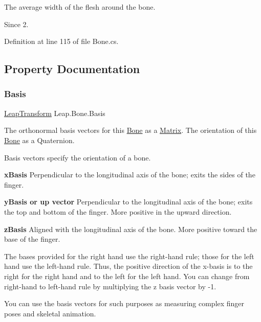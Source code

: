 The average width of the flesh around the bone. 

\begin{DoxySince}{Since}
2. 
\end{DoxySince}


Definition at line 115 of file Bone.\+cs.



\subsection{Property Documentation}
\mbox{\label{class_leap_1_1_bone_a3918f3a7fe8406e54c4715aed7504ab9}} 
\subsubsection{\texorpdfstring{Basis}{Basis}}
{\footnotesize\ttfamily \mbox{\hyperlink{struct_leap_1_1_leap_transform}{Leap\+Transform}} Leap.\+Bone.\+Basis\hspace{0.3cm}{\ttfamily [get]}}



The orthonormal basis vectors for this \mbox{\hyperlink{class_leap_1_1_bone}{Bone}} as a \mbox{\hyperlink{struct_leap_1_1_matrix}{Matrix}}. The orientation of this \mbox{\hyperlink{class_leap_1_1_bone}{Bone}} as a Quaternion. 

Basis vectors specify the orientation of a bone.

{\bfseries{x\+Basis}} Perpendicular to the longitudinal axis of the bone; exits the sides of the finger.

{\bfseries{y\+Basis or up vector}} Perpendicular to the longitudinal axis of the bone; exits the top and bottom of the finger. More positive in the upward direction.

{\bfseries{z\+Basis}} Aligned with the longitudinal axis of the bone. More positive toward the base of the finger.

The bases provided for the right hand use the right-\/hand rule; those for the left hand use the left-\/hand rule. Thus, the positive direction of the x-\/basis is to the right for the right hand and to the left for the left hand. You can change from right-\/hand to left-\/hand rule by multiplying the z basis vector by -\/1.

You can use the basis vectors for such purposes as measuring complex finger poses and skeletal animation.

